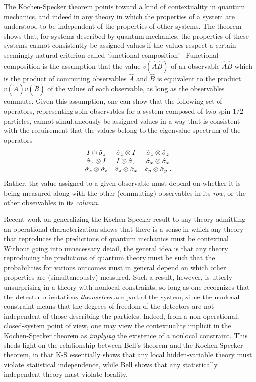 \documentclass[12pt]{article}%
\begin{document}
The Kochen-Specker theorem points toward a kind of contextuality in quantum
mechanics, and indeed in any theory in which the properties of a system are
understood to be independent of the properties of other systems. The theorem
shows that, for systems described by quantum mechanics, the properties of
these systems cannot consistently be assigned values if the values respect a
certain seemingly natural criterion called `functional composition'
\cite{Red89}. Functional composition is the assumption that the value
$v(\hat{A}\hat{B})$ of an observable $\hat{A}\hat{B}$ which is the product of
commuting observables $\hat{A}$ and $\hat{B}$ is equivalent to the product
$v(\hat{A})v(\hat{B})$ of the values of each observable, as long as the
observables commute. Given this assumption, one can show that the following
set of operators, representing spin observables for a system composed of two
spin-$1/2$ particles, cannot simultaneously be assigned values in a way that
is consistent with the requirement that the values belong to the eigenvalue
spectrum of the operators%
\begin{equation}%
\begin{array}
[c]{ccc}%
I\otimes\hat{\sigma}_{z} & \hat{\sigma}_{z}\otimes I & \hat{\sigma}_{z}%
\otimes\hat{\sigma}_{z}\\
\hat{\sigma}_{x}\otimes I & I\otimes\hat{\sigma}_{x} & \hat{\sigma}_{x}%
\otimes\hat{\sigma}_{x}\\
\hat{\sigma}_{x}\otimes\hat{\sigma}_{z} & \hat{\sigma}_{z}\otimes\hat{\sigma
}_{x} & \hat{\sigma}_{y}\otimes\hat{\sigma}_{y}\text{ .}%
\end{array}
\end{equation}
Rather, the value assigned to a given observable must depend on whether it is
being measured along with the other (commuting) observables in its \emph{row},
or the other observables in its \emph{column.}

Recent work on generalizing the Kochen-Specker result to any theory admitting
an operational characterization shows that there is a sense in which any
theory that reproduces the predictions of quantum mechanics must be contextual
\cite{Spek05}. Without going into unnecessary detail, the general idea is that
any theory reproducing the predictions of quantum theory must be such that the
probabilities for various outcomes must in general depend on which other
properties are (simultaneously) measured. Such a result, however, is utterly
unsurprising in a theory with nonlocal constraints, so long as one recognizes
that the detector orientations \emph{themselves} are part of the system, since
the nonlocal constraint means that the degrees of freedom of the detectors are
not independent of those describing the particles. Indeed, from a
non-operational, closed-system point of view, one may view the contextuality
implicit in the Kochen-Specker theorem as \emph{implying} the existence of a
nonlocal constraint. This sheds light on the relationship between Bell's
theorem and the Kochen-Specker theorem, in that K-S essentially shows that any
local hidden-variable theory must violate statistical independence, while Bell
shows that any statistically independent theory must violate locality.
\end{document}
